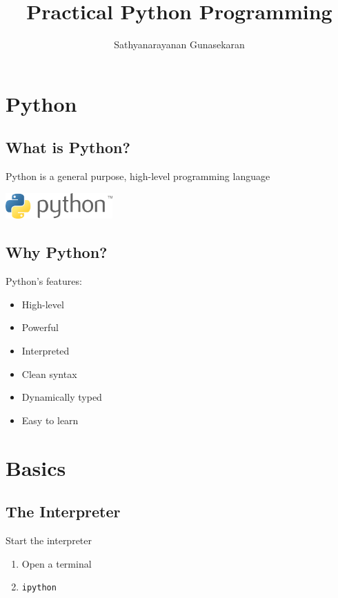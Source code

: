 \documentclass{beamer}
\title{Practical Python Programming}
\author{Sathyanarayanan Gunasekaran}
\institute{CEG Linux Users Group}
\begin{document}
\maketitle
\begin{frame}
 \tableofcontents
\end{frame}
 \section{Python}
  \subsection{What is Python?}
  \begin{frame}
   \vskip1.5cm
   Python is a general purpose, high-level programming language
  \vskip2.5cm
   \begin{center}
    \includegraphics[height=1cm]{python_logo.png}
   \end{center}
  \end{frame}
  \subsection{Why Python?}
  \begin{frame} {Python's features:}
   \begin{itemize}
    \item <2-> High-level
    \item <3-> Powerful 
    \item <4-> Interpreted
    \item <5-> Clean syntax
    \item <6-> Dynamically typed
    \item <7-> Easy to learn
   \end{itemize}
  \end{frame}
 \section{Basics}
  \subsection{The Interpreter}
  \begin{frame} {Start the interpreter}
   \begin{enumerate}
    \item <2-> Open a terminal
    \item <3-> \texttt{ipython}
   \end{enumerate}
  \end{frame}
\end{document}
